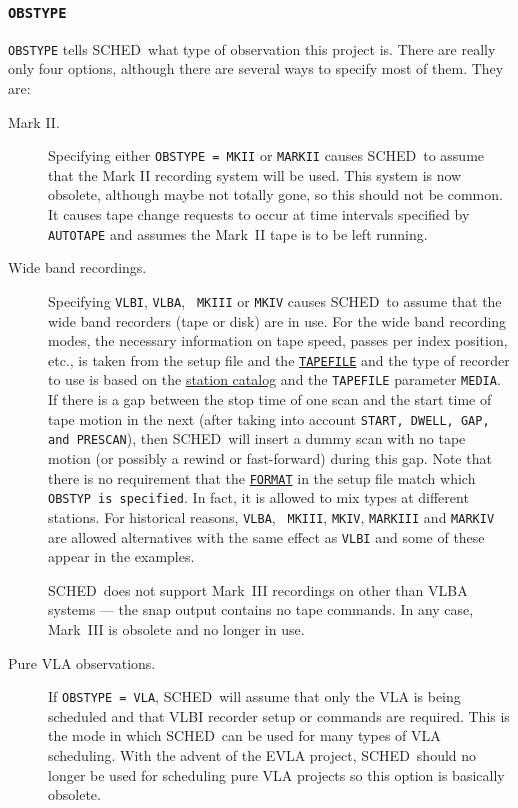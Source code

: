\documentclass{report}
\newcommand{\schedb}{{\sc SCHED~}}
\begin{document}
\subsubsection{\label{MP:OBSTYPE}{\tt OBSTYPE}}

{\tt OBSTYPE} tells \schedb what type of observation this project is.
There are really only four options, although there are several ways
to specify most of them.  They are:

\begin{description}

\item[Mark II.]  Specifying either {\tt OBSTYPE = MKII} or {\tt MARKII}
causes \schedb to assume that the Mark II recording system will be
used.  This system is now obsolete, although maybe not totally gone, so
this should not be common.  It causes tape change requests to occur
at time intervals specified by {\tt AUTOTAPE} and assumes the Mark~II
tape is to be left running.

\item[Wide band recordings.] Specifying {\tt VLBI}, {\tt VLBA}, {\tt
MKIII} or {\tt MKIV} causes \schedb to assume that the wide band
recorders (tape or disk) are in use.  For the wide band recording
modes, the necessary information on tape speed, passes per index
position, etc., is taken from the setup file and the 
{\hyperref[SEC:TPINI]{{\tt TAPEFILE}}}
and the type of recorder to use is based on the
{\hyperref[SEC:STACAT]{station catalog}} and the {\tt TAPEFILE} parameter
{\tt MEDIA}.  If there is a gap between the stop time of one scan and
the start time of tape motion in the next (after taking into account
{\tt START, DWELL, GAP, and PRESCAN}), then \schedb will insert a
dummy scan with no tape motion (or possibly a rewind or fast-forward)
during this gap.  Note that there is no requirement that the
{\hyperref[SP:FORMAT]{{\tt FORMAT}}} in the setup file match which {\tt
OBSTYP is specified}.  In fact, it is allowed to mix types at
different stations.  For historical reasons, {\tt VLBA}, {\tt
MKIII}, {\tt MKIV}, {\tt MARKIII} and {\tt MARKIV} are allowed
alternatives with the same effect as {\tt VLBI} and some of these
appear in the examples.

\schedb does not support Mark~III recordings on other than
VLBA systems --- the snap output contains no tape commands.  In any case,
Mark~III is obsolete and no longer in use.

\item[Pure VLA observations.]  If {\tt OBSTYPE = VLA}, \schedb will
assume that only the VLA is being scheduled and that VLBI recorder setup or
commands are required.  This is the mode in which \schedb can be used
for many types of VLA scheduling.  With the advent of the EVLA project,
\schedb should no longer be used for scheduling pure VLA projects so 
this option is basically obsolete.


\end{description}
\end{document}
